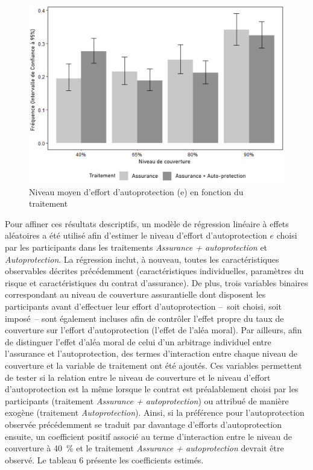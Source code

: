 \begin{Article}
\begin{refsection}[Mouminoux]

\begin{figure}[h!]
\caption{Niveau moyen d’effort d’autoprotection (e) en fonction du traitement}
  \centering
  \includegraphics[width=.8\linewidth]{Articles-bons-a-composer/06_Mouminoux_al/06_Mouminoux_Figures/06_distrib_couv_treatment_english.png}
\end{figure}

Pour affiner ces résultats descriptifs, un modèle de régression linéaire à effets aléatoires a été utilisé afin d'estimer le niveau d'effort d'autoprotection $e$ choisi par les participants dans les traitements \textit{Assurance + autoprotection} et \textit{Autoprotection}. La régression inclut, à nouveau, toutes les caractéristiques observables décrites précédemment (caractéristiques individuelles, paramètres du risque et caractéristiques du contrat d'assurance). De plus, trois variables binaires correspondant au niveau de couverture assurantielle dont disposent les participants avant d'effectuer leur effort d'autoprotection --~soit choisi, soit imposé~-- sont également incluses afin de contrôler l'effet propre du taux de couverture sur l'effort d'autoprotection (l'effet de l'aléa moral). Par ailleurs, afin de distinguer l'effet d'aléa moral de celui d'un arbitrage individuel entre l'assurance et l'autoprotection, des termes d'interaction entre chaque niveau de couverture et la variable de traitement ont été ajoutés. Ces variables permettent de tester si la relation entre le niveau de couverture et le niveau d'effort d'autoprotection est la même lorsque le contrat est préalablement choisi par les participants (traitement \textit{Assurance + autoprotection}) ou attribué de manière exogène (traitement \textit{Autoprotection}). Ainsi, si la préférence pour l'autoprotection observée précédemment se traduit par davantage d'efforts d'autoprotection ensuite, un coefficient positif associé au terme d'interaction entre le niveau de couverture à 40~\% et le traitement \textit{Assurance + autoprotection} devrait être observé. Le tableau 6 présente les coefficients estimés.


\end{refsection}
\end{Article}
